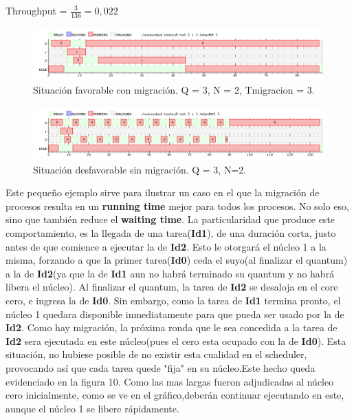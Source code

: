 \documentclass[10pt, a4paper]{article}
\begin{document}
\begin{center}
Throughput = $\frac{3}{136} = 0,022$
\end{center}

\begin{figure}[H]
  	\centering
   	\includegraphics[width=1\textwidth]
   	 {imgs/8Migracion1.png}
	\caption{Situación favorable con migración. Q = 3, N = 2, Tmigracion = 3.}
\end{figure}


\begin{figure}[H]
  	\centering
   	\includegraphics[width=1\textwidth]
   	 {imgs/8NoMigracion1.png}
	\caption{Situación desfavorable sin migración. Q = 3, N=2.}
\end{figure}



Este pequeño ejemplo sirve para ilustrar un caso en el que la migración de procesos resulta en un \textbf{running time} mejor para todos los procesos. 
No solo eso, sino que también reduce el \textbf{waiting time}. La particularidad que produce este comportamiento, es la llegada de una tarea(\textbf{Id1}), de una duración corta, justo antes de que comience a ejecutar la de \textbf{Id2}. Esto le otorgará el núcleo 1 a la misma,
forzando a que la primer tarea(\textbf{Id0}) ceda el suyo(al finalizar el quantum) a la de \textbf{Id2}(ya que la de \textbf{Id1} aun no habrá terminado su quantum y no habrá libera el núcleo). Al finalizar el quantum, la tarea de \textbf{Id2} se desaloja en el core cero, e ingresa la de \textbf{Id0}. Sin embargo, como la tarea de \textbf{Id1} termina pronto, el núcleo 1 quedara disponible inmediatamente para que pueda ser usado por la de \textbf{Id2}.
Como hay migración, la próxima ronda que le sea concedida a la tarea de \textbf{Id2} sera ejecutada en este núcleo(pues el cero esta ocupado con la de \textbf{Id0}). Esta situación, no hubiese
posible de no existir esta cualidad en el scheduler, provocando así que cada tarea quede "fija"  en su núcleo.Este hecho queda evidenciado en la figura 10. 
Como las mas largas fueron adjudicadas al núcleo cero inicialmente, como se ve en el gráfico,deberán continuar ejecutando en este, aunque el núcleo 1 se libere rápidamente.
\end{document}
